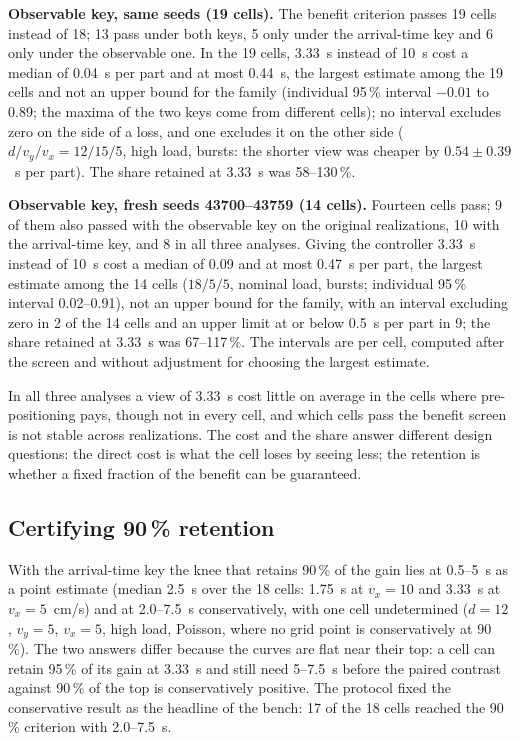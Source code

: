 \documentclass[11pt,a4paper]{article}
\begin{document}
\textbf{Observable key, same seeds (19 cells).} The benefit criterion passes 19 cells
instead of 18; 13 pass under both keys, 5 only under the arrival-time key and 6 only under
the observable one. In the 19 cells, 3.33~s instead of 10~s cost a median of 0.04~s per
part and at most 0.44~s, the largest estimate among the 19 cells and not an upper bound for
the family (individual 95\,\% interval $-0.01$ to 0.89; the maxima of the two keys come from
different cells); no
interval excludes zero on the side of a loss, and one excludes it on the other side
($d/v_y/v_x=12/15/5$, high load, bursts: the shorter view was cheaper by $0.54\pm0.39$~s per
part). The share retained at 3.33~s was 58--130\,\%.

\textbf{Observable key, fresh seeds 43700--43759 (14 cells).} Fourteen cells pass; 9 of them
also passed with the observable key on the original realizations, 10 with the
arrival-time key, and 8 in all three analyses. Giving the controller 3.33~s instead of 10~s
cost a median of 0.09 and at most 0.47~s per part, the largest estimate among the 14 cells
($18/5/5$, nominal load, bursts; individual 95\,\% interval 0.02--0.91), not an upper bound
for the family, with an interval excluding zero in 2 of the 14 cells and an upper limit at
or below 0.5~s per part in 9; the share retained at 3.33~s was 67--117\,\%. The intervals
are per cell, computed after the screen and without adjustment for choosing the largest
estimate.

In all three analyses a view of 3.33~s cost little on average in the cells where
pre-positioning pays, though not in every cell, and which cells pass the benefit screen is
not stable across realizations. The cost and the share answer different design questions:
the direct cost is what the cell loses by seeing less; the retention is whether a fixed
fraction of the benefit can be guaranteed.

\subsection{Certifying 90\,\% retention}\label{sec:retention}
With the arrival-time key the knee that retains 90\,\% of the gain lies at 0.5--5~s as a
point estimate (median 2.5~s over the 18 cells: 1.75~s at $v_x=10$ and 3.33~s at
$v_x=5$~cm/s) and at 2.0--7.5~s conservatively, with one cell undetermined ($d=12$,
$v_y=5$, $v_x=5$, high load, Poisson, where no grid point is conservatively at 90\,\%). The
two answers differ because the curves are flat near their top: a cell can retain 95\,\% of
its gain at 3.33~s and still need 5--7.5~s before the paired contrast against 90\,\% of the
top is conservatively positive. The protocol fixed the conservative result as the
headline of the bench: 17 of the 18 cells reached the 90\,\% criterion with 2.0--7.5~s.
\end{document}
